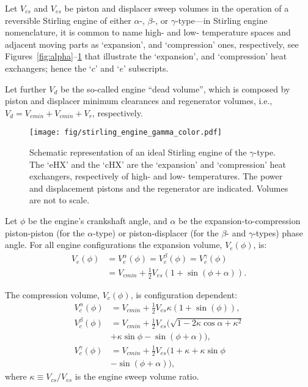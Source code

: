     Let $V_{cs}$ and $V_{es}$ be piston and displacer  sweep  volumes  in  the  operation  of  a
    reversible Stirling engine of either $\alpha$-,  $\beta$-,  or  $\gamma$-type---in  Stirling
    engine nomenclature, it is common to name high- and low-  temperature  spaces  and  adjacent
    moving   parts   as    `expansion',    and    `compression'    ones,    respectively,    see
    Figures~\ref{fig:alpha}--\ref{fig:gamma} that illustrate the `expansion', and  `compression'
    heat exchangers; hence the `$c$' and `$e$' subscripts.

    Let further $V_d$ be the so-called engine ``dead volume'', which is composed by  piston  and
    displacer minimum clearances and regenerator volumes, i.e., $V_d =  V_{emin}  +  V_{cmin}  +
    V_r$, respectively.

    \begin{figure}[ht]
        \centering
        \texttt{[image: fig/stirling\_engine\_gamma\_color.pdf]}
        \caption{Schematic representation of an ideal Stirling engine of the $\gamma$-type.  The
            `eHX'  and  the  `cHX'  are  the  `expansion'  and  `compression'  heat  exchangers,
            respectively of high- and low- temperatures. The power and displacement pistons  and
            the regenerator are indicated. Volumes are not to scale.}
        \label{fig:gamma}
    \end{figure}

    Let $\phi$ be the engine's crankshaft angle, and $\alpha$  be  the  expansion-to-compression
    piston-piston  (for  the  $\alpha$-type)  or  piston-displacer   (for   the   $\beta$-   and
    $\gamma$-types)  phase  angle.  For  all  engine  configurations   the   expansion   volume,
    $V_e(\phi)$, is:
    \begin{align}
        \label{eq:Ve}
        V_e(\phi) &= V^{\alpha}_e(\phi) = V^{\beta}_e(\phi) = V^{\gamma}_e(\phi) \nonumber\\
                  &= V_{emin} + \frac{1}{2} V_{es}(1 + \sin(\phi + \alpha)).
    \end{align}

    The compression volume, $V_c(\phi)$, is configuration dependent:
    \begin{align}
        \label{eq:Vca}
        V^{\alpha}_c(\phi) &= V_{cmin} + \frac{1}{2} V_{es} \kappa (1 + \sin(\phi)), \\
        \label{eq:Vcb}
        V^{\beta}_c(\phi)  &= V_{cmin} +
            \frac{1}{2} V_{es} (\sqrt{1 - 2\kappa\cos\alpha + \kappa^2} \nonumber\\
                           &+ \kappa\sin\phi - \sin(\phi + \alpha)), \\
        \label{eq:Vcg}
        V^{\gamma}_c(\phi) &= V_{cmin} + \frac{1}{2} V_{es}
            (1 + \kappa + \kappa\sin\phi \nonumber\\
                           &- \sin(\phi + \alpha)),
    \end{align}
    \noindent where $\kappa \equiv V_{cs}/V_{es}$ is the engine sweep volume ratio.

